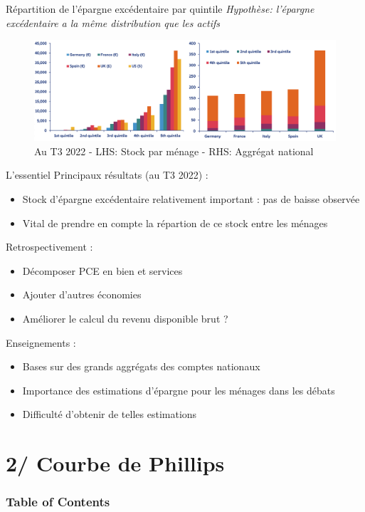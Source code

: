 \documentclass[9pt, xcolor={dvipsnames}]{beamer}
\begin{document}
\begin{frame}{Répartition de l'épargne excédentaire par quintile}
  \textit{Hypothèse: l'épargne excédentaire a la même distribution que les actifs}
  \begin{figure}
    \centering
    \includegraphics[width=1\textwidth]{img/xSavings.png}
    \caption{Au T3 2022 - LHS: Stock par ménage - RHS: Aggrégat national}
  \end{figure}
\end{frame}

\begin{frame}{L'essentiel}
  Principaux résultats (au T3 2022) :
  \begin{itemize}
    \item Stock d'épargne excédentaire relativement important : pas de baisse observée
    \item Vital de prendre en compte la répartion de ce stock entre les ménages
  \end{itemize}
  \vspace{.2cm}
  Retrospectivement :
  \begin{itemize}
    \item Décomposer PCE en bien et services
    \item Ajouter d'autres économies 
    \item Améliorer le calcul du revenu disponible brut ?
  \end{itemize}
  \vspace{.2cm}
  Enseignements :
  \begin{itemize}
    \item Bases sur des grands aggrégats des comptes nationaux
    \item Importance des estimations d'épargne pour les ménages dans les débats  
    \item Difficulté d'obtenir de telles estimations
  \end{itemize}
\end{frame}

\section{2/ Courbe de Phillips}
\begin{frame}
  \frametitle{Table of Contents}
  \tableofcontents[currentsection]
\end{frame}
\end{document}
